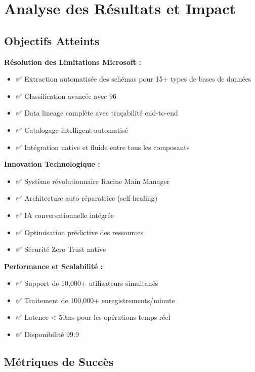 \documentclass[a4paper,12pt]{article}
\begin{document}
\newpage

\section{Analyse des Résultats et Impact}

\subsection{Objectifs Atteints}

\textbf{Résolution des Limitations Microsoft :}
\begin{itemize}
    \item ✅ Extraction automatisée des schémas pour 15+ types de bases de données
    \item ✅ Classification avancée avec 96%
    \item ✅ Data lineage complète avec traçabilité end-to-end
    \item ✅ Catalogage intelligent automatisé
    \item ✅ Intégration native et fluide entre tous les composants
\end{itemize}

\textbf{Innovation Technologique :}
\begin{itemize}
    \item ✅ Système révolutionnaire Racine Main Manager
    \item ✅ Architecture auto-réparatrice (self-healing)
    \item ✅ IA conversationnelle intégrée
    \item ✅ Optimisation prédictive des ressources
    \item ✅ Sécurité Zero Trust native
\end{itemize}

\textbf{Performance et Scalabilité :}
\begin{itemize}
    \item ✅ Support de 10,000+ utilisateurs simultanés
    \item ✅ Traitement de 100,000+ enregistrements/minute
    \item ✅ Latence < 50ms pour les opérations temps réel
    \item ✅ Disponibilité 99.9%
\end{itemize}

\subsection{Métriques de Succès}
\end{document}
